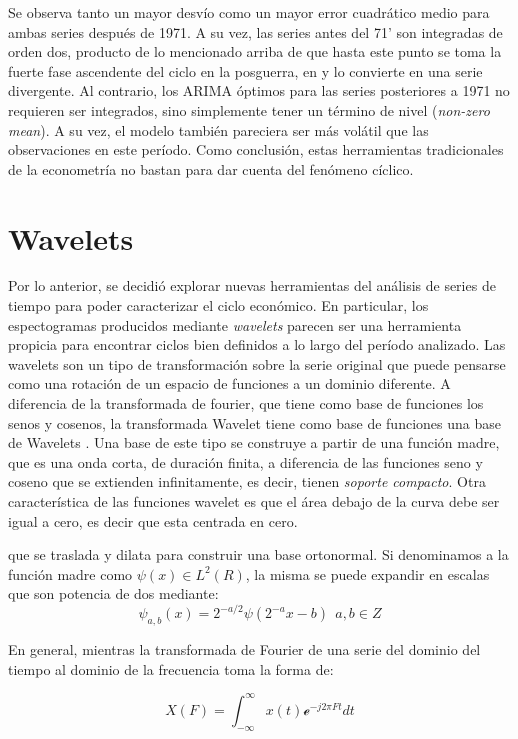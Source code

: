 \documentclass[a4paper]{article}
\begin{document}
Se observa tanto un mayor desvío como un mayor error cuadrático medio para ambas series después de 1971. A su vez, las series antes del 71' son integradas de orden dos, producto de lo mencionado arriba de que hasta este punto se toma la fuerte fase ascendente del ciclo en la posguerra, en y lo convierte en una serie divergente. Al contrario, los ARIMA óptimos para las series posteriores a 1971 no requieren ser integrados, sino simplemente tener un término de nivel (\textit{non-zero mean}). A su vez, el modelo también pareciera ser más volátil que las observaciones en este período. Como conclusión, estas herramientas tradicionales de la econometría no bastan para dar cuenta del fenómeno cíclico. 

\section{Wavelets}

Por lo anterior, se decidió explorar nuevas herramientas del análisis de series de tiempo para poder caracterizar el ciclo económico. En particular, los espectogramas producidos mediante \textit{wavelets} parecen ser una herramienta propicia para encontrar ciclos bien definidos a lo largo del período analizado. Las wavelets son un tipo de transformación sobre la serie original que puede pensarse como una rotación de un espacio de funciones a un dominio diferente. A diferencia de la transformada de fourier, que tiene como base de funciones los senos y cosenos, la transformada Wavelet tiene como base de funciones una base de Wavelets \cite{castro1995wavelets}. Una base de este tipo se construye a partir de una función madre, que es una onda corta, de duración finita, a diferencia de las funciones seno y coseno que se extienden infinitamente, es decir, tienen \textit{soporte compacto}. Otra característica de las funciones wavelet es que el área debajo de la curva debe ser igual a cero, es decir que esta centrada en cero.  


que se traslada y dilata para construir una base ortonormal.  Si denominamos a la función madre como $\psi(x)\in L^2(R)$, la misma se puede expandir en escalas que son potencia de dos mediante:
$$
\psi_{a,b}(x)=2^{-a/2}\psi(2^{-a} x-b) \ \ a,b \in Z
$$

En general, mientras la transformada de Fourier de una serie del dominio del tiempo al dominio de la frecuencia toma la forma de:

$$
X(F)=\int_{-\infty}^{\infty} x(t) \mathcal{e}^{-j2\pi Ft}dt
$$
\end{document}
